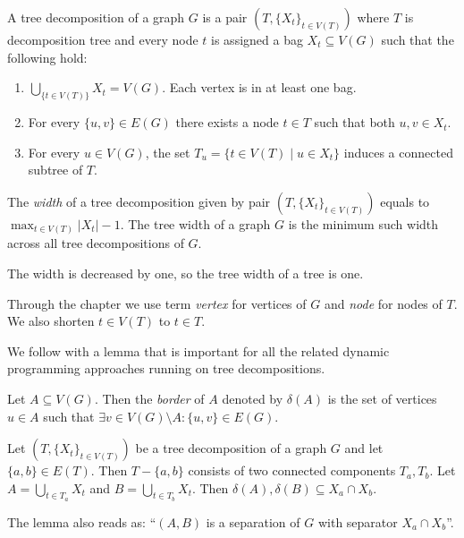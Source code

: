 %
\begin{definition}
	A tree decomposition of a graph \( G \) is
	a pair \( (T, {\{X_t\}}_{t \in V ( T )}) \)
	where \( T \) is decomposition tree and every node \( t \)
	is assigned a bag \( X_t \subseteq V(G) \) such that the following hold:
	\begin{enumerate}
		\item \( \bigcup_{\{t \in V(T)\}} X_t = V(G) \).
		      Each vertex is in at least one bag.
		\item For every \( \{u,v\} \in E(G) \) there exists
		      a node \( t \in T \) such that both \( u, v \in X_t \).
		\item For every \( u \in V(G) \),
		      the set \( T_u = \{t \in V(T) \mid u \in X_t\} \)
		      induces a connected subtree of \( T \).
	\end{enumerate}
\end{definition}
%
\begin{definition}
	The \emph{width} of a tree decomposition given by pair
	\( (T, {\{X_t\}}_{t \in V ( T )}) \)
	equals to \( \max_{t\in V(T)} |X_t| - 1 \).
	The tree width of a graph \( G \) is the minimum such width
	across all tree decompositions of \( G \).
\end{definition}
%
The width is decreased by one, so the tree width of a tree is one.

Through the chapter we use term \emph{vertex} for vertices of \( G \)
and \emph{node} for nodes of \( T \).
We also shorten \( t \in V(T) \) to \( t \in T \).

We follow with a lemma that is important for all the related
dynamic programming approaches running on tree decompositions.
%
\begin{definition}
	Let \( A \subseteq V(G) \). Then the \emph{border} of \( A \) denoted by \( \delta(A) \)
	is the set of vertices \( u \in A \)
	such that \( \exists v \in V(G) \setminus A : \{u, v\} \in E(G) \).
\end{definition}
%
\begin{lemma}
	Let \( (T, {\{X_t\}}_{t \in V ( T )}) \)
	be a tree decomposition of a graph \( G \)
	and let \( \{a, b\} \in E(T) \).
	Then \( T - \{a, b\} \) consists of two connected components \( T_a, T_b \).
	Let \( A = \bigcup_{t \in T_a} X_t \) and \( B = \bigcup_{t \in T_b} X_t \).
	Then \( \delta(A), \delta(B) \subseteq X_a \cap X_b \).
\end{lemma}
%
The lemma also reads as:
``\( (A, B) \) is a separation of \( G \) with separator \( X_a \cap X_b \)''.

